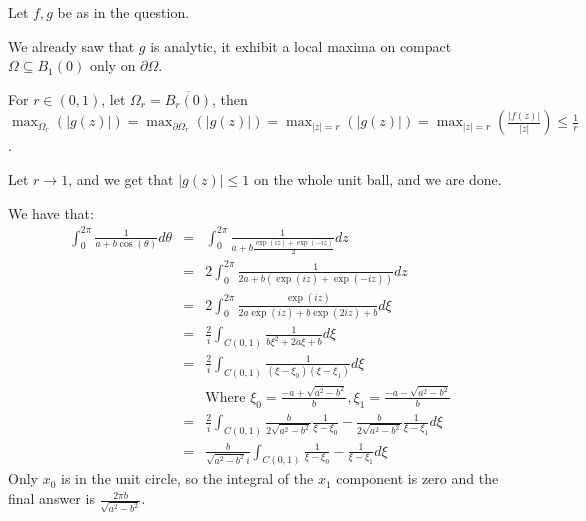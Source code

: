 \begin{cExercise}
	Let $f,g$ be as in the question.
	
	We already saw that $g$ is analytic, it exhibit a local maxima on compact $\Omega\subseteq B_1(0)$ only on $\partial \Omega$.
	
	For $r\in(0,1)$, let $\Omega_r=\overline{B_r(0)}$, then $\max_{\Omega_r}(|g(z)|)=\max_{\partial\Omega_r}(|g(z)|)=\max_{|z|=r}(|g(z)|)=\max_{|z|=r}\left(\frac{|f(z)|}{|z|}\right)\le\frac1{r}$.
	
	Let $r\to 1$, and we get that $|g(z)|\le 1$ on the whole unit ball, and we are done.
\end{cExercise}
\begin{cExercise}
	We have that:
	\begin{align*}
		&\int_0^{2\pi}\frac1{a+b\cos(\theta)}d\theta&=&\int_0^{2\pi}\frac1{a+b\frac{\exp(iz)+\exp(-iz)}{2}}dz&\\
		&&=&2\int_0^{2\pi}\frac1{2a+b(\exp(iz)+\exp(-iz))}dz&\\
		&&=&2\int_0^{2\pi}\frac{\exp(iz)}{2a\exp(iz)+b\exp(2iz)+b}d\xi&\\
		&&=&\frac2i\int_{C(0,1)}\frac{1}{b\xi^2+2a\xi+b}d\xi&\\
		&&=&\frac2i\int_{C(0,1)}\frac{1}{(\xi-\xi_0)(\xi-\xi_1)}d\xi&\\
		&&&\text{Where $\xi_{0}=\frac{-a+\sqrt{a^2-b^2}}{b}, \xi_{1}=\frac{-a-\sqrt{a^2-b^2}}{b}$}&\\
		&&=&\frac2i\int_{C(0,1)}\frac{b}{2\sqrt{a^2-b^2}}\frac{1}{\xi-\xi_0}-\frac{b}{2\sqrt{a^2-b^2}}\frac{1}{\xi-\xi_1}d\xi&\\
		&&=&\frac{b}{\sqrt{a^2-b^2}i}\int_{C(0,1)}\frac{1}{\xi-\xi_0}-\frac{1}{\xi-\xi_1}d\xi&
	\end{align*}
	Only $x_0$ is in the unit circle, so the integral of the $x_1$ component is zero and the final answer is $\frac{2\pi b}{\sqrt{a^2-b^2}}$.
\end{cExercise}






